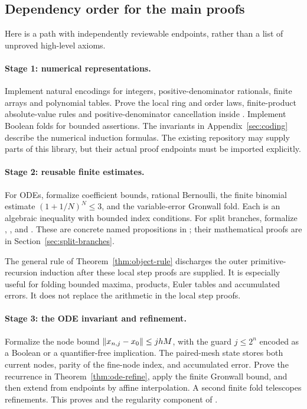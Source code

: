 \subsection{Dependency order for the main proofs}

Here is a path with independently reviewable endpoints, rather than a list
of unproved high-level axioms.

\paragraph{Stage 1: numerical representations.}
Implement natural encodings for integers, positive-denominator rationals,
finite arrays and polynomial tables. Prove the local ring and order laws,
finite-product absolute-value rules and positive-denominator cancellation
inside . Implement Boolean folds for bounded assertions.
The invariants in Appendix~\ref{sec:coding} describe the numerical
induction formulas. The existing repository may supply parts of this
library, but their actual proof endpoints must be imported explicitly.

\paragraph{Stage 2: reusable finite estimates.}
For ODEs, formalize coefficient bounds, rational Bernoulli, the finite
binomial estimate $(1+1/N)^N\le3$, and the variable-error Gronwall fold.
Each is an algebraic inequality with bounded index conditions. For split
branches, formalize ,
,  and
. These are concrete named propositions
in ; their mathematical proofs are in
Section~\ref{sec:split-branches}.

The general rule of Theorem~\ref{thm:object-rule} discharges the outer
primitive-recursion induction after these local step proofs are supplied.
It is especially useful for folding bounded maxima, products, Euler tables
and accumulated errors. It does not replace the arithmetic in the local
step proofs.

\paragraph{Stage 3: the ODE invariant and refinement.}
Formalize the node bound
$\left\lVert x_{n,j}-x_0\right\rVert\le jhM$, with the guard $j\le2^n$ encoded as a
Boolean or a quantifier-free implication. The paired-mesh state stores
both current nodes, parity of the fine-node index, and accumulated
error. Prove the recurrence in Theorem~\ref{thm:ode-refine}, apply the
finite Gronwall bound, and then extend from endpoints by affine
interpolation. A second finite fold telescopes refinements.
This proves  and the regularity component of
.

